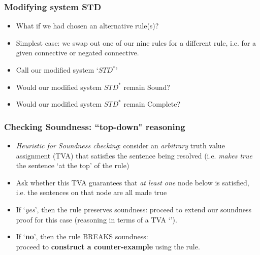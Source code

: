 \begin{frame}
\frametitle{Modifying system STD}

\begin{itemize}[<+->]

\item What if we had chosen an alternative rule(s)? 

\item Simplest case: we swap out one of our nine rules for a different rule, i.e. for a given connective or negated connective. 

\item Call our modified system `$STD^{\ast}$'%




\item Would our modified system $STD^{\ast}$ remain Sound?

\item Would our modified system $STD^{\ast}$ remain Complete?

\end{itemize}
\end{frame}



\begin{frame}
\frametitle{Checking Soundness: ``top-down" reasoning}

\begin{itemize}[<+->]

\item \emph{Heuristic for Soundness checking}: consider an \emph{arbitrary} truth value assignment (TVA) that satisfies the sentence being resolved (i.e. \textit{makes true} the sentence `at the top' of the rule)

\item Ask whether this TVA guarantees that \emph{at least one} node below is satisfied, i.e. the sentences on that node are all made true

\item If `\emph{yes}', then the rule preserves soundness: proceed to extend our soundness proof for this case (reasoning in terms of a TVA `'). 

\item If `\textbf{\textcolor{OGlyallpink}{no}}', then the rule BREAKS soundness: \\ proceed to \textbf{\textcolor{OGlyallpink}{construct a counter-example}} using the rule. 

\end{itemize}
\end{frame}


